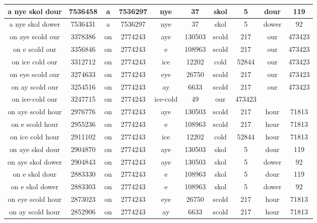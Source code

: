 \begin {longtable}{ cc|cccccccc }
 a nye skol dour   &  7536458  &   a   &  7536297  &   nye   &  37  &   skol   &  5  &   dour   &  119   \\ \hline
 a nye skol dower   &  7536431  &   a   &  7536297  &   nye   &  37  &   skol   &  5  &   dower   &  92   \\ \hline
 on aye scold our   &  3378386  &   on   &  2774243  &   aye   &  130503  &   scold   &  217  &   our   &  473423   \\ \hline
 on e scold our   &  3356846  &   on   &  2774243  &   e   &  108963  &   scold   &  217  &   our   &  473423   \\ \hline
 on ice cold our   &  3312712  &   on   &  2774243  &   ice   &  12202  &   cold   &  52844  &   our   &  473423   \\ \hline
 on eye scold our   &  3274633  &   on   &  2774243  &   eye   &  26750  &   scold   &  217  &   our   &  473423   \\ \hline
 on ay scold our   &  3254516  &   on   &  2774243  &   ay   &  6633  &   scold   &  217  &   our   &  473423   \\ \hline
 on ice-cold our   &  3247715  &   on   &  2774243  &   ice-cold   &  49  &   our   &  473423  &     &     \\ \hline
 on aye scold hour   &  2976776  &   on   &  2774243  &   aye   &  130503  &   scold   &  217  &   hour   &  71813   \\ \hline
 on e scold hour   &  2955236  &   on   &  2774243  &   e   &  108963  &   scold   &  217  &   hour   &  71813   \\ \hline
 on ice cold hour   &  2911102  &   on   &  2774243  &   ice   &  12202  &   cold   &  52844  &   hour   &  71813   \\ \hline
 on aye skol dour   &  2904870  &   on   &  2774243  &   aye   &  130503  &   skol   &  5  &   dour   &  119   \\ \hline
 on aye skol dower   &  2904843  &   on   &  2774243  &   aye   &  130503  &   skol   &  5  &   dower   &  92   \\ \hline
 on e skol dour   &  2883330  &   on   &  2774243  &   e   &  108963  &   skol   &  5  &   dour   &  119   \\ \hline
 on e skol dower   &  2883303  &   on   &  2774243  &   e   &  108963  &   skol   &  5  &   dower   &  92   \\ \hline
 on eye scold hour   &  2873023  &   on   &  2774243  &   eye   &  26750  &   scold   &  217  &   hour   &  71813   \\ \hline
 on ay scold hour   &  2852906  &   on   &  2774243  &   ay   &  6633  &   scold   &  217  &   hour   &  71813   \\ \hline

\end{longtable}
